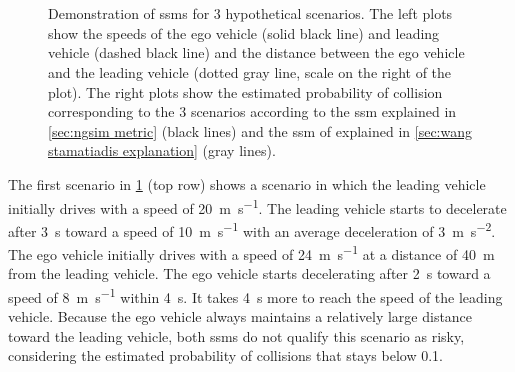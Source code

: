 \setlength{\figurewidth}{.45\linewidth}
\setlength{\figureheight}{0.6\figurewidth}
\begin{figure}
	\centering
	
	\\
	
	\\
	
	
	\caption{Demonstration of \acp{ssm} for 3 hypothetical scenarios. 
		The left plots show the speeds of the ego vehicle (solid black line) and leading vehicle (dashed black line) and the distance between the ego vehicle and the leading vehicle (dotted gray line, scale on the right of the plot).
		The right plots show the estimated probability of collision corresponding to the 3 scenarios according to the \ac{ssm} explained in \cref{sec:ngsim metric} (black lines) and the \ac{ssm} of \textcite{wang2014evaluation} explained in \cref{sec:wang stamatiadis explanation} (gray lines).}
	\label{fig:scenarios}		
\end{figure}

The first scenario in \cref{fig:scenarios} (top row) shows a scenario in which the leading vehicle initially drives with a speed of \SI{20}{\meter\per\second}.
The leading vehicle starts to decelerate after \SI{3}{\second} toward a speed of \SI{10}{\meter\per\second} with an average deceleration of \SI{3}{\meter\per\second\squared}.
The ego vehicle initially drives with a speed of \SI{24}{\meter\per\second} at a distance of \SI{40}{\meter} from the leading vehicle.
The ego vehicle starts decelerating after \SI{2}{\second} toward a speed of \SI{8}{\meter\per\second} within \SI{4}{\second}.
It takes \SI{4}{\second} more to reach the speed of the leading vehicle.
Because the ego vehicle always maintains a relatively large distance toward the leading vehicle, both \acp{ssm} do not qualify this scenario as risky, considering the estimated probability of collisions that stays below 0.1.

